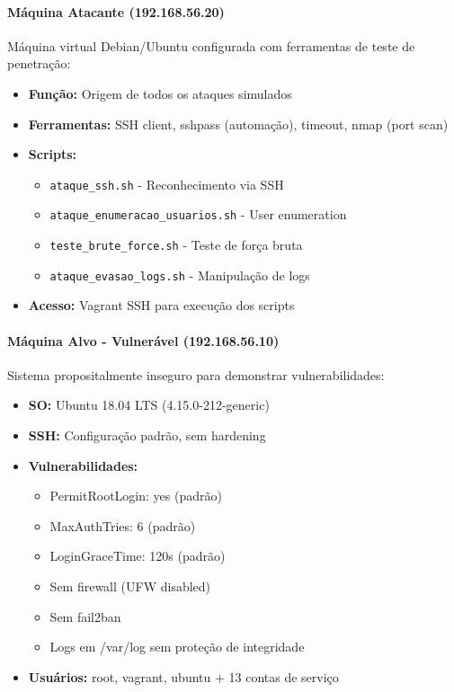 \documentclass[12pt]{article}
\begin{document}
\paragraph{Máquina Atacante (192.168.56.20)}
Máquina virtual Debian/Ubuntu configurada com ferramentas de teste de penetração:
\begin{itemize}
    \item \textbf{Função:} Origem de todos os ataques simulados
    \item \textbf{Ferramentas:} SSH client, sshpass (automação), timeout, nmap (port scan)
    \item \textbf{Scripts:} 
        \begin{itemize}
            \item \texttt{ataque\_ssh.sh} - Reconhecimento via SSH
            \item \texttt{ataque\_enumeracao\_usuarios.sh} - User enumeration
            \item \texttt{teste\_brute\_force.sh} - Teste de força bruta
            \item \texttt{ataque\_evasao\_logs.sh} - Manipulação de logs
        \end{itemize}
    \item \textbf{Acesso:} Vagrant SSH para execução dos scripts
\end{itemize}

\paragraph{Máquina Alvo - Vulnerável (192.168.56.10)}
Sistema propositalmente inseguro para demonstrar vulnerabilidades:
\begin{itemize}
    \item \textbf{SO:} Ubuntu 18.04 LTS (4.15.0-212-generic)
    \item \textbf{SSH:} Configuração padrão, sem hardening
    \item \textbf{Vulnerabilidades:}
        \begin{itemize}
            \item PermitRootLogin: yes (padrão)
            \item MaxAuthTries: 6 (padrão)
            \item LoginGraceTime: 120s (padrão)
            \item Sem firewall (UFW disabled)
            \item Sem fail2ban
            \item Logs em /var/log sem proteção de integridade
        \end{itemize}
    \item \textbf{Usuários:} root, vagrant, ubuntu + 13 contas de serviço
\end{itemize}
\end{document}

